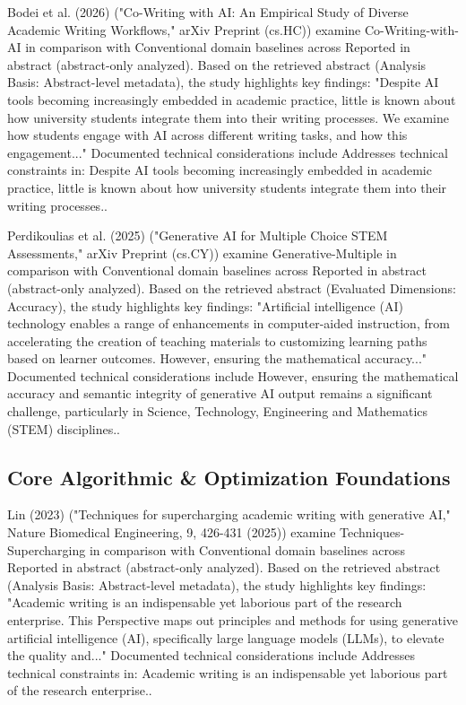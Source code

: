 \documentclass[10pt,twocolumn,letterpaper]{article}
\begin{document}
Bodei et al. (2026) \cite{ref17} ("Co-Writing with AI: An Empirical Study of Diverse Academic Writing Workflows," arXiv Preprint (cs.HC)) examine Co-Writing-with-AI in comparison with Conventional domain baselines across Reported in abstract (abstract-only analyzed). Based on the retrieved abstract (Analysis Basis: Abstract-level metadata), the study highlights key findings: "Despite AI tools becoming increasingly embedded in academic practice, little is known about how university students integrate them into their writing processes. We examine how students engage with AI across different writing tasks, and how this engagement..." Documented technical considerations include Addresses technical constraints in: Despite AI tools becoming increasingly embedded in academic practice, little is known about how university students integrate them into their writing processes..

Perdikoulias et al. (2025) \cite{ref19} ("Generative AI for Multiple Choice STEM Assessments," arXiv Preprint (cs.CY)) examine Generative-Multiple in comparison with Conventional domain baselines across Reported in abstract (abstract-only analyzed). Based on the retrieved abstract (Evaluated Dimensions: Accuracy), the study highlights key findings: "Artificial intelligence (AI) technology enables a range of enhancements in computer-aided instruction, from accelerating the creation of teaching materials to customizing learning paths based on learner outcomes. However, ensuring the mathematical accuracy..." Documented technical considerations include However, ensuring the mathematical accuracy and semantic integrity of generative AI output remains a significant challenge, particularly in Science, Technology, Engineering and Mathematics (STEM) disciplines..

\subsection{Core Algorithmic \& Optimization Foundations}
Lin (2023) \cite{ref16} ("Techniques for supercharging academic writing with generative AI," Nature Biomedical Engineering, 9, 426-431 (2025)) examine Techniques-Supercharging in comparison with Conventional domain baselines across Reported in abstract (abstract-only analyzed). Based on the retrieved abstract (Analysis Basis: Abstract-level metadata), the study highlights key findings: "Academic writing is an indispensable yet laborious part of the research enterprise. This Perspective maps out principles and methods for using generative artificial intelligence (AI), specifically large language models (LLMs), to elevate the quality and..." Documented technical considerations include Addresses technical constraints in: Academic writing is an indispensable yet laborious part of the research enterprise..
\end{document}
